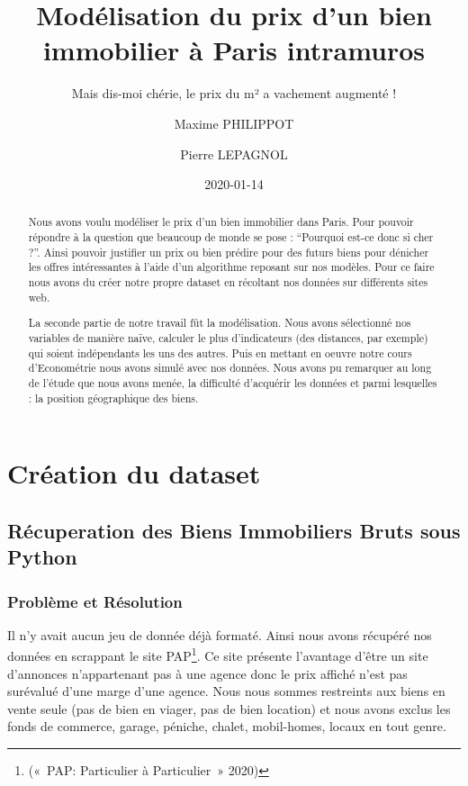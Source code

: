\documentclass[french,]{article}
\title{Modélisation du prix d'un bien immobilier à Paris intramuros}
\subtitle{Mais dis-moi chérie, le prix du m² a vachement augmenté !}
\author{Maxime PHILIPPOT \and Pierre LEPAGNOL}
\date{2020-01-14}
\begin{document}
\maketitle
\begin{abstract}
Nous avons voulu modéliser le prix d'un bien immobilier dans Paris. Pour
pouvoir répondre à la question que beaucoup de monde se pose :
``Pourquoi est-ce donc si cher ?''. Ainsi pouvoir justifier un prix ou
bien prédire pour des futurs biens pour dénicher les offres
intéressantes à l'aide d'un algorithme reposant sur nos modèles. Pour ce
faire nous avons du créer notre propre dataset en récoltant nos données
sur différents sites web.

La seconde partie de notre travail fût la modélisation. Nous avons
sélectionné nos variables de manière naïve, calculer le plus
d'indicateurs (des distances, par exemple) qui soient indépendants les
uns des autres. Puis en mettant en oeuvre notre cours d'Econométrie nous
avons simulé avec nos données. Nous avons pu remarquer au long de
l'étude que nous avons menée, la difficulté d'acquérir les données et
parmi lesquelles : la position géographique des biens.
\end{abstract}

{
\setcounter{tocdepth}{3}
\tableofcontents
}
\hypertarget{cruxe9ation-du-dataset}{%
\section{Création du dataset}\label{cruxe9ation-du-dataset}}

\hypertarget{ruxe9cuperation-des-biens-immobiliers-bruts-sous-python}{%
\subsection{Récuperation des Biens Immobiliers Bruts sous
Python}\label{ruxe9cuperation-des-biens-immobiliers-bruts-sous-python}}

\hypertarget{probluxe8me-et-ruxe9solution}{%
\subsubsection{Problème et
Résolution}\label{probluxe8me-et-ruxe9solution}}

Il n'y avait aucun jeu de donnée déjà formaté. Ainsi nous avons récupéré
nos données en scrappant le site PAP\footnote{(«~PAP: Particulier à
  Particulier~» 2020)}. Ce site présente l'avantage d'être un site
d'annonces n'appartenant pas à une agence donc le prix affiché n'est pas
surévalué d'une marge d'une agence. Nous nous sommes restreints aux
biens en vente seule (pas de bien en viager, pas de bien location) et
nous avons exclus les fonds de commerce, garage, péniche, chalet,
mobil-homes, locaux en tout genre.
\end{document}
